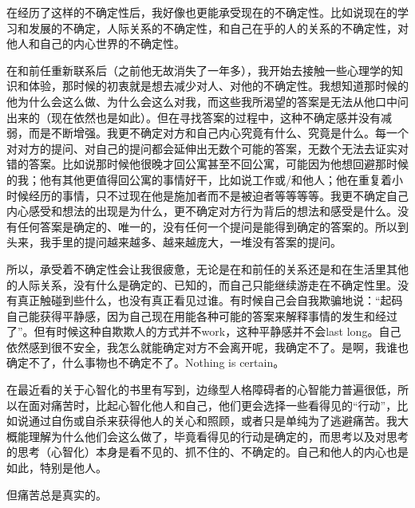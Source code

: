 在经历了这样的不确定性后，我好像也更能承受现在的不确定性。比如说现在的学习和发展的不确定，人际关系的不确定性，和自己在乎的人的关系的不确定性，对他人和自己的内心世界的不确定性。

在和前任重新联系后（之前他无故消失了一年多），我开始去接触一些心理学的知识和体验，那时候的初衷就是想去减少对人、对他的不确定性。我想知道那时候的他为什么会这么做、为什么会这么对我，而这些我所渴望的答案是无法从他口中问出来的（现在依然也是如此）。但在寻找答案的过程中，这种不确定感并没有减弱，而是不断增强。我更不确定对方和自己内心究竟有什么、究竟是什么。每一个对对方的提问、对自己的提问都会延伸出无数个可能的答案，无数个无法去证实对错的答案。比如说那时候他很晚才回公寓甚至不回公寓，可能因为他想回避那时候的我；他有其他更值得回公寓的事情好干，比如说工作或/和他人；他在重复着小时候经历的事情，只不过现在他是施加者而不是被迫者等等等等。我更不确定自己内心感受和想法的出现是为什么，更不确定对方行为背后的想法和感受是什么。没有任何答案是确定的、唯一的，没有任何一个提问是能得到确定的答案的。所以到头来，我手里的提问越来越多、越来越庞大，一堆没有答案的提问。

所以，承受着不确定性会让我很疲惫，无论是在和前任的关系还是和在生活里其他的人际关系，没有什么是确定的、已知的，而自己只能继续游走在不确定性里。没有真正触碰到些什么，也没有真正看见过谁。有时候自己会自我欺骗地说：“起码自己能获得平静感，因为自己现在用能各种可能的答案来解释事情的发生和经过了”。但有时候这种自欺欺人的方式并不work，这种平静感并不会last long。自己依然感到很不安全，我怎么就能确定对方不会离开呢，我确定不了。是啊，我谁也确定不了，什么事物也不确定不了。Nothing is certain。

在最近看的关于心智化的书里有写到，边缘型人格障碍者的心智能力普遍很低，所以在面对痛苦时，比起心智化他人和自己，他们更会选择一些看得见的“行动”，比如说通过自伤或自杀来获得他人的关心和照顾，或者只是单纯为了逃避痛苦。我大概能理解为什么他们会这么做了，毕竟看得见的行动是确定的，而思考以及对思考的思考（心智化）本身是看不见的、抓不住的、不确定的。自己和他人的内心也是如此，特别是他人。

但痛苦总是真实的。

